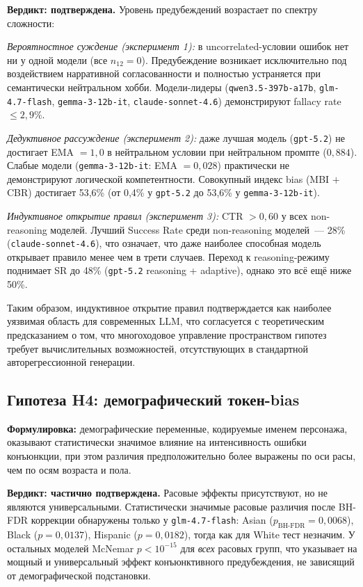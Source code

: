 \textbf{Вердикт: подтверждена.} Уровень предубеждений возрастает по спектру сложности:

\textit{Вероятностное суждение (эксперимент 1):} в uncorrelated-условии ошибок нет ни у одной модели (все $n_{12} = 0$). Предубеждение возникает исключительно под воздействием нарративной согласованности и полностью устраняется при семантически нейтральном хобби. Модели-лидеры (\texttt{qwen3.5-397b-a17b}, \texttt{glm-4.7-flash}, \texttt{gemma-3-12b-it}, \texttt{claude-sonnet-4.6}) демонстрируют fallacy rate $\leq 2{,}9\%$.

\textit{Дедуктивное рассуждение (эксперимент 2):} даже лучшая модель (\texttt{gpt-5.2}) не достигает EMA $= 1{,}0$ в нейтральном условии при нейтральном промпте ($0{,}884$). Слабые модели (\texttt{gemma-3-12b-it}: EMA $= 0{,}028$) практически не демонстрируют логической компетентности. Совокупный индекс bias (MBI $+$ CBR) достигает 53,6\% (от 0,4\% у \texttt{gpt-5.2} до 53,6\% у \texttt{gemma-3-12b-it}).

\textit{Индуктивное открытие правил (эксперимент 3):} CTR $> 0{,}60$ у всех non-reasoning моделей. Лучший Success Rate среди non-reasoning моделей~--- 28\% (\texttt{claude-sonnet-4.6}), что означает, что даже наиболее способная модель открывает правило менее чем в трети случаев. Переход к reasoning-режиму поднимает SR до 48\% (\texttt{gpt-5.2} reasoning + adaptive), однако это всё ещё ниже 50\%.

Таким образом, индуктивное открытие правил подтверждается как наиболее уязвимая область для современных LLM, что согласуется с теоретическим предсказанием о том, что многоходовое управление пространством гипотез требует вычислительных возможностей, отсутствующих в стандартной авторегрессионной генерации.

\subsection{Гипотеза H4: демографический токен-bias}

\textbf{Формулировка:} демографические переменные, кодируемые именем персонажа, оказывают статистически значимое влияние на интенсивность ошибки конъюнкции, при этом различия предположительно более выражены по оси расы, чем по осям возраста и пола.

\textbf{Вердикт: частично подтверждена.} Расовые эффекты присутствуют, но не являются универсальными. Статистически значимые расовые различия после BH-FDR коррекции обнаружены только у \texttt{glm-4.7-flash}: Asian ($p_{\text{BH-FDR}} = 0{,}0068$), Black ($p = 0{,}0137$), Hispanic ($p = 0{,}0182$), тогда как для White тест незначим. У остальных моделей McNemar $p < 10^{-15}$ для \textit{всех} расовых групп, что указывает на мощный и универсальный эффект конъюнктивного предубеждения, не зависящий от демографической подстановки.

